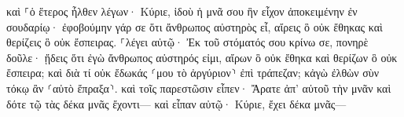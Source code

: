 \documentclass{openreader}
\begin{document}
καὶ ⸀ὁ ἕτερος ἦλθεν λέγων· Κύριε, ἰδοὺ ἡ μνᾶ σου ἣν εἶχον ἀποκειμένην ἐν σουδαρίῳ· 
ἐφοβούμην γάρ σε ὅτι ἄνθρωπος αὐστηρὸς εἶ, αἴρεις ὃ οὐκ ἔθηκας καὶ θερίζεις ὃ οὐκ ἔσπειρας. 
⸀λέγει αὐτῷ· Ἐκ τοῦ στόματός σου κρίνω σε, πονηρὲ δοῦλε· ᾔδεις ὅτι ἐγὼ ἄνθρωπος αὐστηρός εἰμι, αἴρων ὃ οὐκ ἔθηκα καὶ θερίζων ὃ οὐκ ἔσπειρα; 
καὶ διὰ τί οὐκ ἔδωκάς ⸂μου τὸ ἀργύριον⸃ ἐπὶ τράπεζαν; κἀγὼ ἐλθὼν σὺν τόκῳ ἂν ⸂αὐτὸ ἔπραξα⸃. 
καὶ τοῖς παρεστῶσιν εἶπεν· Ἄρατε ἀπ’ αὐτοῦ τὴν μνᾶν καὶ δότε τῷ τὰς δέκα μνᾶς ἔχοντι— 
καὶ εἶπαν αὐτῷ· Κύριε, ἔχει δέκα μνᾶς— 
\end{document}
